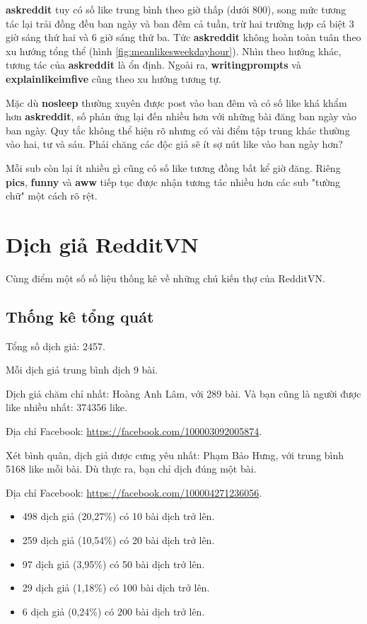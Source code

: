 \documentclass[10pt,a4paper]{article}
\begin{document}
\textbf{askreddit} tuy có số like trung bình theo giờ thấp (dưới 800), song mức tương tác lại trải đồng đều ban ngày và ban đêm cả tuần, trừ hai trường hợp cá biệt 3 giờ sáng thứ hai và 6 giờ sáng thứ ba. Tức \textbf{askreddit} không hoàn toàn tuân theo xu hướng tổng thể (hình \eqref{fig:meanlikesweekdayhour}). Nhìn theo hướng khác, tương tác của \textbf{askreddit} là ổn định. Ngoài ra, \textbf{writingprompts} và \textbf{explainlikeimfive} cũng theo xu hướng tương tự.

Mặc dù \textbf{nosleep} thường xuyên được post vào ban đêm và có số like khá khẩm hơn \textbf{askreddit}, số phản ứng lại đến nhiều hơn với những bài đăng ban ngày vào ban ngày. Quy tắc không thể hiện rõ nhưng có vài điểm tập trung khác thường vào hai, tư và sáu. Phải chăng các độc giả sẽ ít sợ nút like vào ban ngày hơn?

Mỗi sub còn lại ít nhiều gì cũng có số like tương đồng bất kể giờ đăng. Riêng \textbf{pics}, \textbf{funny} và \textbf{aww} tiếp tục được nhận tương tác nhiều hơn các sub "tường chữ" một cách rõ rệt.

\section{Dịch giả RedditVN}
Cùng điểm một số số liệu thống kê về những chú kiến thợ của RedditVN.
\subsection{Thống kê tổng quát}
Tổng số dịch giả: 2457.

Mỗi dịch giả trung bình dịch 9 bài.

Dịch giả chăm chỉ nhất: Hoàng Anh Lâm, với 289 bài. Và bạn cũng là người được like nhiều nhất: 374356 like.

Địa chỉ Facebook: \href{https://facebook.com/100003092005874}{https://facebook.com/100003092005874}.

Xét bình quân, dịch giả được cưng yêu nhất: Phạm Bảo Hưng, với trung bình 5168 like mỗi bài. Dù thực ra, bạn chỉ dịch đúng một bài.

Địa chỉ Facebook: \href{https://facebook.com/100004271236056}{https://facebook.com/100004271236056}.

\begin{itemize}
    \item 498 dịch giả (20,27\%) có 10 bài dịch trở lên.
    \item 259 dịch giả (10,54\%) có 20 bài dịch trở lên.
    \item 97 dịch giả (3,95\%) có 50 bài dịch trở lên.
    \item 29 dịch giả (1,18\%) có 100 bài dịch trở lên.
    \item 6 dịch giả (0,24\%) có 200 bài dịch trở lên.
\end{itemize}
\end{document}
